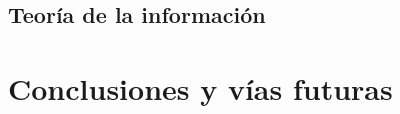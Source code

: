 \documentclass[10pt, compress]{beamer}
\newcommand\R{\mathbb{R}}
\begin{document}
\subsection{Teoría de la información}

\section{Conclusiones y vías futuras}

\end{document}
